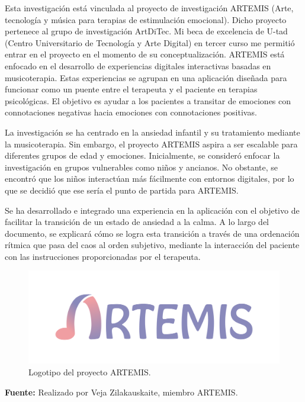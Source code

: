 Esta investigación está vinculada al proyecto de investigación ARTEMIS (Arte, tecnología y música para terapias de estimulación emocional). Dicho proyecto pertenece al grupo de investigación ArtDiTec. Mi beca de excelencia de U-tad (Centro Universitario de Tecnología y Arte Digital) en tercer curso me permitió entrar en el proyecto en el momento de su conceptualización. ARTEMIS está enfocado en el desarrollo de experiencias digitales interactivas basadas en musicoterapia. Estas experiencias se agrupan en una aplicación diseñada para funcionar como un puente entre el terapeuta y el paciente en terapias psicológicas. El objetivo es ayudar a los pacientes a transitar de emociones con connotaciones negativas hacia emociones con connotaciones positivas.

La investigación se ha centrado en la ansiedad infantil y su tratamiento mediante la musicoterapia. Sin embargo, el proyecto ARTEMIS aspira a ser escalable para diferentes grupos de edad y emociones. Inicialmente, se consideró enfocar la investigación en grupos vulnerables como niños y ancianos. No obstante, se encontró que los niños interactúan más fácilmente con entornos digitales, por lo que se decidió que ese sería el punto de partida para ARTEMIS.

Se ha desarrollado e integrado una experiencia en la aplicación con el objetivo de facilitar la transición de un estado de ansiedad a la calma. A lo largo del documento, se explicará cómo se logra esta transición a través de una ordenación rítmica que pasa del caos al orden subjetivo, mediante la interacción del paciente con las instrucciones proporcionadas por el terapeuta.

\begin{figure} [h!]
	\centering
	\includegraphics[width=0.6\linewidth]{Figuras/Introduccion/1_LogoArtemis}
	\caption{Logotipo del proyecto ARTEMIS.}
	\label{fig:logoArtemis}
	\vspace{-30pt}
\end{figure}

\begin{center}
	\textbf{Fuente:} Realizado por Veja Zilakauskaite, miembro ARTEMIS.
\end{center}

